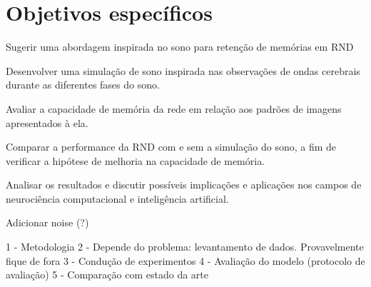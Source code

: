 \section{Objetivos específicos}

Sugerir uma abordagem inspirada no sono para retenção de memórias em RND

Desenvolver uma simulação de sono inspirada nas observações de ondas cerebrais durante as diferentes fases do sono.

Avaliar a capacidade de memória da rede em relação aos padrões de imagens apresentados à ela.

Comparar a performance da RND com e sem a simulação do sono, a fim de verificar a hipótese de melhoria na capacidade de memória.

Analisar os resultados e discutir possíveis implicações e aplicações nos campos de neurociência computacional e inteligência
artificial.

Adicionar noise (?)
 


1 - Metodologia
2 - Depende do problema: levantamento de dados. Provavelmente fique de fora
3 - Condução de experimentos
4 - Avaliação do modelo (protocolo de avaliação)
5 - Comparação com estado da arte
